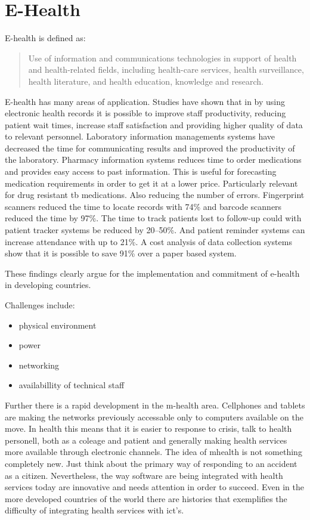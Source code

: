 
\section{E-Health}
E-health is defined as:
\begin{quotation}
Use of information and communications technologies in support of health and health-related fields, including health-care services, health surveillance, health literature, and health education, knowledge and research.
\end{quotation}

E-health has many areas of application. Studies have shown that in by using electronic health records it is possible to improve staff productivity, reducing patient wait times, increase staff satisfaction and providing higher quality of data to relevant personnel. Laboratory information managements systems have decreased the time for communicating results and improved the productivity of the laboratory. Pharmacy information systems reduces time to order medications and provides easy access to past information. This is useful for forecasting medication requirements in order to get it at a lower price. Particularly relevant for drug resistant \gls{tb} medications. Also reducing the number of errors. Fingerprint scanners reduced the time to locate records with 74\% and barcode scanners reduced the time by 97\%. The time to track patients lost to follow-up could with patient tracker systems be reduced by 20--50\%. And patient reminder systems can increase attendance with up to 21\%. A cost analysis of data collection systems show that it is possible to save 91\% over a paper based system. 

These findings clearly argue for the implementation and commitment of e-health in developing countries. 

Challenges include:
\begin{itemize}
\item physical environment
\item power
\item networking
\item availabillity of technical staff
\end{itemize}

Further there is a rapid development in the m-health area.
Cellphones and tablets are making the networks previously accessable only to computers available on the move.
In health this means that it is easier to response to crisis, talk to health personell, both as a coleage and patient and generally making health services more available through electronic channels. 
The idea of mhealth is not something completely new. Just think about the primary way of responding to an accident as a citizen. 
Nevertheless, the way software are being integrated with health services today are innovative and needs attention in order to succeed.
Even in the more developed countries of the world there are histories that exemplifies the difficulty of integrating health services with \gls{ict}'s.  

